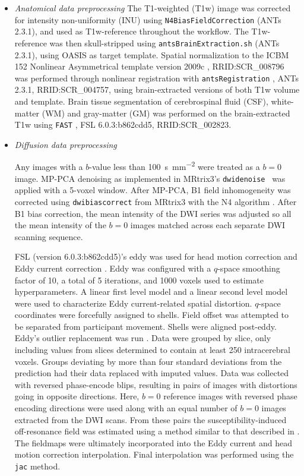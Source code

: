 \documentclass[9pt,lineno]{elife}
\begin{document}
\begin{itemize}

\item {\it Anatomical data preprocessing}
The T1-weighted (T1w) image was corrected for intensity non-uniformity (INU)
using \texttt{N4BiasFieldCorrection} \citep{n4} (ANTs 2.3.1), and used as
T1w-reference throughout the workflow. The T1w-reference was then skull-stripped
using \texttt{antsBrainExtraction.sh} (ANTs 2.3.1), using OASIS as target
template. Spatial normalization to the ICBM 152 Nonlinear Asymmetrical template
version 2009c \citep{mni}, RRID:SCR\_008796 was performed through nonlinear
registration with \texttt{antsRegistration} \citep{ants}, ANTs 2.3.1,
RRID:SCR\_004757, using brain-extracted versions of both T1w volume and
template. Brain tissue segmentation of cerebrospinal fluid (CSF), white-matter
(WM) and gray-matter (GM) was performed on the brain-extracted T1w using
\texttt{FAST} \citep{fsl-fast}, FSL 6.0.3:b862cdd5, RRID:SCR\_002823.

\item {\it Diffusion data preprocessing}

Any images with a $b$-value less than \qty{100}{\second \per \mm^{2}} were treated
as a $b=0$ image. MP-PCA denoising as implemented in MRtrix3's \texttt{dwidenoise}~\citep{dwidenoise1} was applied with a 5-voxel window. After
MP-PCA, B1 field inhomogeneity was corrected using \texttt{dwibiascorrect} from
MRtrix3 with the N4 algorithm \citep{n4}. After B1 bias correction, the mean
intensity of the DWI series was adjusted so all the mean intensity of the $b=0$
images matched across each separate DWI scanning sequence.

FSL (version 6.0.3:b862cdd5)'s eddy was used for head motion correction
and Eddy current correction \citep{anderssoneddy}. Eddy was configured
with a \(q\)-space smoothing factor of 10, a total of 5 iterations, and
\num{1000} voxels used to estimate hyperparameters. A linear first level model
and a linear second level model were used to characterize Eddy
current-related spatial distortion. \(q\)-space coordinates were
forcefully assigned to shells. Field offset was attempted to be
separated from participant movement. Shells were aligned post-eddy. Eddy's
outlier replacement was run \citep{eddyrepol}. Data were grouped by
slice, only including values from slices determined to contain at least
\num{250} intracerebral voxels. Groups deviating by more than four standard
deviations from the prediction had their data replaced with imputed
values. Data was collected with reversed phase-encode blips, resulting
in pairs of images with distortions going in opposite directions. Here,
$b=0$ reference images with reversed phase encoding directions were used
along with an equal number of $b=0$ images extracted from the DWI scans.
From these pairs the susceptibility-induced off-resonance field was
estimated using a method similar to that described in \citep{topup}. The
fieldmaps were ultimately incorporated into the Eddy current and head
motion correction interpolation. Final interpolation was performed using
the \texttt{jac} method.


\end{itemize}
\end{document}
